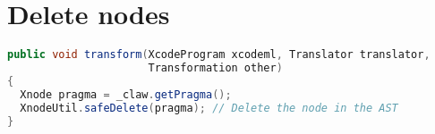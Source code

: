 \section{Delete nodes}
\begin{lstlisting}[label=lst:delete_node, language=Java,
  caption=XcodeML delete node example]
public void transform(XcodeProgram xcodeml, Translator translator,
                      Transformation other)
{
  Xnode pragma = _claw.getPragma();
  XnodeUtil.safeDelete(pragma); // Delete the node in the AST
}
\end{lstlisting}
